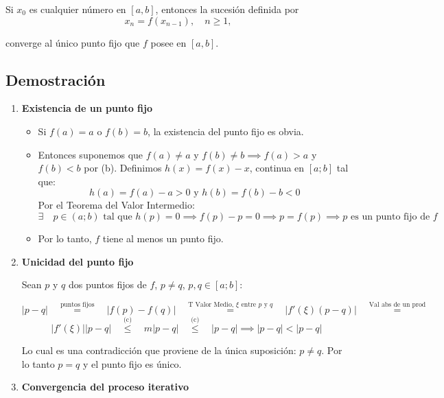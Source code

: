 \documentclass[openany]{book}
\providecommand{\tightlist}{%
  \setlength{\itemsep}{0pt}\setlength{\parskip}{0pt}}
\newcommand{\equaltext}[1]{\ensuremath{\quad \stackrel{\text{#1}}{=} \quad }}
\newcommand{\leqtext}[1]{\ensuremath{\quad \stackrel{\text{#1}}{\leq} \quad }}
\begin{document}
Si \(x_0\) es cualquier número en \([a, b]\), entonces la sucesión definida por
\[ x_n = f(x_{n-1}), \quad n \ge 1,\]

converge al único punto fijo que \(f\) posee en \([a, b]\).

\hypertarget{demostraciuxf3n}{%
\subsection*{Demostración}\label{demostraciuxf3n}}

\begin{enumerate}
\def\labelenumi{\arabic{enumi}.}
\item
  \textbf{Existencia de un punto fijo}

  \begin{itemize}
  \tightlist
  \item
    Si \(f(a) = a\) o \(f(b) = b\), la existencia del punto fijo es obvia.
  \item
    Entonces suponemos que \(f(a) \neq a\) y \(f(b) \neq b \implies f(a) > a\) y \(f(b) < b\) por (b).
    Definimos \(h(x) = f(x) - x\), continua en \([a; b]\) tal que:
    \[h(a) = f(a) - a > 0 \text{ y } h(b) = f(b) - b < 0\]
    Por el Teorema del Valor Intermedio:
    \[ \exists \quad p \in (a; b) \text{ tal que } h(p) = 0 \implies f(p) - p = 0 \implies p = f(p) \implies p \text{ es un punto fijo de } f\]
  \item
    Por lo tanto, \(f\) tiene al menos un punto fijo.
  \end{itemize}
\item
  \textbf{Unicidad del punto fijo}

  Sean \(p\) y \(q\) dos puntos fijos de \(f\), \(p \neq q\), \(p, q \in [a; b]\):

  \[ |p-q| \equaltext{puntos fijos} | f(p) - f(q) | \equaltext{T Valor Medio, $\xi$ entre $p$ y $q$} |f'(\xi) (p - q)| \equaltext{Val abs de un prod} \]
  \[ |f'(\xi)| |p-q| \leqtext{(c)} m |p-q| \leqtext{(c)} |p-q| \implies |p-q| < |p-q| \]

  Lo cual es una contradicción que proviene de la única suposición: \(p \neq q\). Por lo tanto \(p = q\) y el punto fijo es único.
\item
  \textbf{Convergencia del proceso iterativo}


\end{enumerate}
\end{document}
